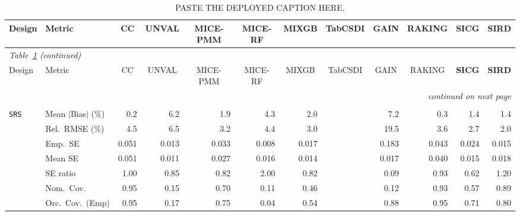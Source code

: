 \begin{landscape}
\footnotesize\setlength{\tabcolsep}{3.5pt}
\begin{longtable}{llrrrrrrrrrr}
\caption{PASTE THE DEPLOYED CAPTION HERE.}
\label{tab:appc_surv_SampleE} \\
\toprule
Design & Metric & \multicolumn{1}{c}{CC} & \multicolumn{1}{c}{UNVAL} & \multicolumn{1}{c}{MICE-PMM} & \multicolumn{1}{c}{MICE-RF} & \multicolumn{1}{c}{MIXGB} & \multicolumn{1}{c}{TabCSDI} & \multicolumn{1}{c}{GAIN} & \multicolumn{1}{c}{RAKING} & \multicolumn{1}{c}{\textbf{SICG}} & \multicolumn{1}{c}{\textbf{SIRD}} \\
\midrule \endfirsthead
\multicolumn{12}{l}{\footnotesize\itshape Table~\ref{tab:appc_surv_SampleE} (continued)} \\
\toprule
Design & Metric & \multicolumn{1}{c}{CC} & \multicolumn{1}{c}{UNVAL} & \multicolumn{1}{c}{MICE-PMM} & \multicolumn{1}{c}{MICE-RF} & \multicolumn{1}{c}{MIXGB} & \multicolumn{1}{c}{TabCSDI} & \multicolumn{1}{c}{GAIN} & \multicolumn{1}{c}{RAKING} & \multicolumn{1}{c}{\textbf{SICG}} & \multicolumn{1}{c}{\textbf{SIRD}} \\
\midrule \endhead
\midrule \multicolumn{12}{r}{\footnotesize\itshape continued on next page} \\
\endfoot
\bottomrule \endlastfoot
\multicolumn{12}{l}{\textbf{Continuous Phase-Two Covariates}} \\
\addlinespace[2pt]
\quad \texttt{SRS} & Mean $|$Bias$|$ (\%) & \cellcolor{rankone}0.2 & 6.2 & 1.9 & 4.3 & 2.0 &  & 7.2 & \cellcolor{ranktwo}0.3 & \cellcolor{rankthree}1.4 & 1.4 \\
 & Rel.\ RMSE (\%) & 4.5 & 6.5 & 3.2 & 4.4 & \cellcolor{rankthree}3.0 &  & 19.5 & 3.6 & \cellcolor{ranktwo}2.7 & \cellcolor{rankone}2.0 \\
 & Emp.\ SE & 0.051 & 0.013 & 0.033 & 0.008 & 0.017 &  & 0.183 & 0.043 & 0.024 & 0.015 \\
 & Mean SE & 0.051 & 0.011 & 0.027 & 0.016 & 0.014 &  & 0.017 & 0.040 & 0.015 & 0.018 \\
 & SE ratio & \cellcolor{rankone}1.00 & \cellcolor{rankthree}0.85 & 0.82 & 2.00 & 0.82 &  & 0.09 & \cellcolor{ranktwo}0.93 & 0.62 & 1.20 \\
 & Nom.\ Cov. & \cellcolor{rankone}0.95 & 0.15 & 0.70 & 0.11 & 0.46 &  & 0.12 & \cellcolor{ranktwo}0.93 & 0.57 & \cellcolor{rankthree}0.89 \\
 & Orc.\ Cov.\ (Emp) & \cellcolor{ranktwo}0.95 & 0.17 & 0.75 & 0.04 & 0.54 &  & \cellcolor{rankthree}0.88 & \cellcolor{rankone}0.95 & 0.71 & 0.80 \\

\end{longtable}
\end{landscape}
